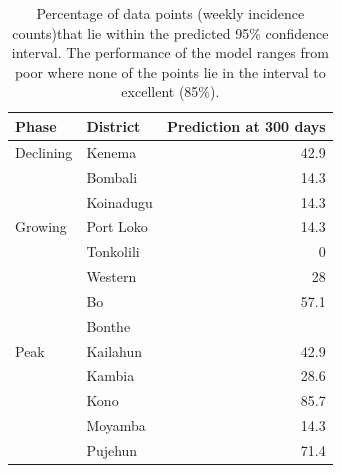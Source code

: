 \documentclass[a4paper,12pt]{article}
\newcommand{\ra}[1]{\renewcommand{\arraystretch}{#1}}
\begin{document}
\begin{table}\centering
  \ra{1.3}
  \begin{tabular}{@{}llr@{}}\toprule
    Phase & District & Prediction at 300 days \\
    \midrule
    Declining & Kenema & 42.9 \\
\addlinespace    
    & Bombali & 14.3 \\
    & Koinadugu & 14.3  \\    
   Growing & Port Loko & 14.3 \\
    & Tonkolili & 0 \\
    & Western & 28  \\    
\addlinespace
    & Bo &  57.1 \\
    & Bonthe &  \\
Peak    & Kailahun & 42.9 \\
    & Kambia & 28.6 \\
    & Kono & 85.7  \\
    & Moyamba & 14.3 \\
    & Pujehun & 71.4 \\
\end{tabular}
\caption{Percentage of data points (weekly incidence counts)that
lie within the predicted 95\% confidence interval. The performance of
the model ranges from poor where none of the points lie in the
interval to excellent (85\%).}
    \label{tab:fitgoodness}
  
  \end{table}
  
\end{document}
